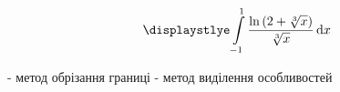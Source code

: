 ﻿\[\displaystlye\int\limits_{-1}^1 \frac{\ln \left(2 + \sqrt[3]{x}\right)}{\sqrt[3]{x}}\,\mathrm{d}x\]


- метод обрізання границі
- метод виділення особливостей
